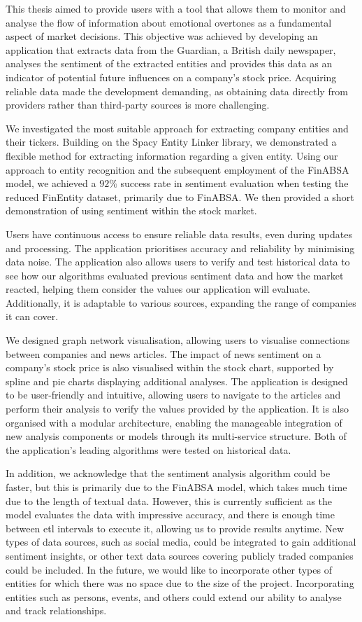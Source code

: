 
This thesis aimed to provide users with a tool that allows them to monitor and analyse the flow of information about emotional overtones as a fundamental aspect of market decisions. This objective was achieved by developing an application that extracts data from the Guardian, a British daily newspaper, analyses the sentiment of the extracted entities and provides this data as an indicator of potential future influences on a company's stock price. Acquiring reliable data made the development demanding, as obtaining data directly from providers rather than third-party sources is more challenging.

We investigated the most suitable approach for extracting company entities and their tickers. Building on the Spacy Entity Linker library, we demonstrated a flexible method for extracting information regarding a given entity. Using our approach to entity recognition and the subsequent employment of the FinABSA model, we achieved a $92\%$ success rate in sentiment evaluation when testing the reduced FinEntity dataset, primarily due to FinABSA. We then provided a short demonstration of using sentiment within the stock market.

Users have continuous access to ensure reliable data results, even during updates and processing. The application prioritises accuracy and reliability by minimising data noise. The application also allows users to verify and test historical data to see how our algorithms evaluated previous sentiment data and how the market reacted, helping them consider the values our application will evaluate. Additionally, it is adaptable to various sources, expanding the range of companies it can cover.

We designed graph network visualisation, allowing users to visualise connections between companies and news articles. The impact of news sentiment on a company's stock price is also visualised within the stock chart, supported by spline and pie charts displaying additional analyses. The application is designed to be user-friendly and intuitive, allowing users to navigate to the articles and perform their analysis to verify the values provided by the application. It is also organised with a modular architecture, enabling the manageable integration of new analysis components or models through its multi-service structure. Both of the application's leading algorithms were tested on historical data. 

In addition, we acknowledge that the sentiment analysis algorithm could be faster, but this is primarily due to the FinABSA model, which takes much time due to the length of textual data. However, this is currently sufficient as the model evaluates the data with impressive accuracy, and there is enough time between \acrshort{etl} intervals to execute it, allowing us to provide results anytime. New types of data sources, such as social media, could be integrated to gain additional sentiment insights, or other text data sources covering publicly traded companies could be included. In the future, we would like to incorporate other types of entities for which there was no space due to the size of the project. Incorporating entities such as persons, events, and others could extend our ability to analyse and track relationships.

